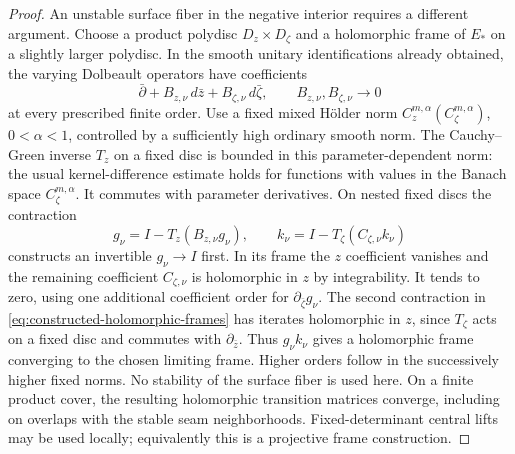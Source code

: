 \documentclass[11pt]{amsart}
\theoremstyle{definition}
\theoremstyle{remark}
\theoremstyle{plain}
\begin{document}
\begin{proof}
An unstable surface fiber in the negative interior requires a different
argument. Choose a product polydisc $D_z\times D_\zeta$ and a
holomorphic frame of $E_*$ on a slightly larger polydisc. In the
smooth unitary identifications already obtained, the varying Dolbeault
operators have coefficients
\begin{equation}\label{eq:constructed-interior-dolbeault}
 \bar\partial+B_{z,\nu}\,d\bar z+B_{\zeta,\nu}\,d\bar\zeta,
          \qquad B_{z,\nu},B_{\zeta,\nu}\longrightarrow0
\end{equation}
at every prescribed finite order. Use a fixed mixed H\"older norm
$C^{m,\alpha}_z(C^{m,\alpha}_\zeta)$, $0<\alpha<1$, controlled by
a sufficiently high ordinary smooth norm. The Cauchy--Green inverse
$T_z$ on a fixed disc is bounded in this parameter-dependent norm:
the usual kernel-difference estimate holds for functions with values
in the Banach space $C^{m,\alpha}_\zeta$. It commutes with parameter
derivatives. On nested fixed discs the contraction
\begin{equation}\label{eq:constructed-holomorphic-frames}
             g_\nu=I-T_z(B_{z,\nu}g_\nu),\qquad
             k_\nu=I-T_\zeta(C_{\zeta,\nu}k_\nu)
\end{equation}
constructs an invertible $g_\nu\to I$ first. In its frame the $z$
coefficient vanishes and the remaining coefficient $C_{\zeta,\nu}$
is holomorphic in $z$ by integrability. It tends to zero, using one
additional coefficient order for $\partial_{\bar\zeta}g_\nu$.
The second contraction in
\eqref{eq:constructed-holomorphic-frames} has iterates holomorphic in
$z$, since $T_\zeta$ acts on a fixed disc and commutes with
$\partial_{\bar z}$. Thus $g_\nu k_\nu$ gives a holomorphic frame
converging to the chosen limiting frame. Higher orders follow in the
successively higher fixed norms. No stability of the surface fiber is
used here. On a finite product cover, the resulting holomorphic
transition matrices converge, including on overlaps with the stable
seam neighborhoods. Fixed-determinant central lifts may be used locally;
equivalently this is a projective frame construction.


\end{proof}
\end{document}

